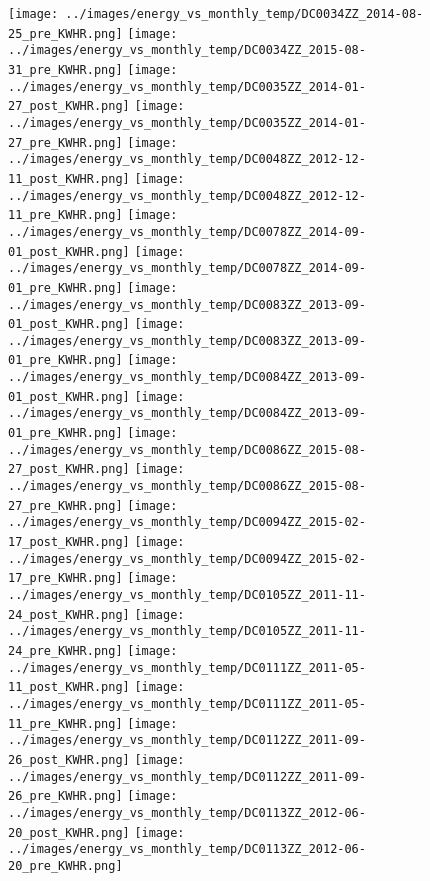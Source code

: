 \clearpage
\begin{figure}
\centering
\texttt{[image: ../images/energy\_vs\_monthly\_temp/DC0034ZZ\_2014-08-25\_pre\_KWHR.png]}
\texttt{[image: ../images/energy\_vs\_monthly\_temp/DC0034ZZ\_2015-08-31\_pre\_KWHR.png]}
\texttt{[image: ../images/energy\_vs\_monthly\_temp/DC0035ZZ\_2014-01-27\_post\_KWHR.png]}
\texttt{[image: ../images/energy\_vs\_monthly\_temp/DC0035ZZ\_2014-01-27\_pre\_KWHR.png]}
\texttt{[image: ../images/energy\_vs\_monthly\_temp/DC0048ZZ\_2012-12-11\_post\_KWHR.png]}
\texttt{[image: ../images/energy\_vs\_monthly\_temp/DC0048ZZ\_2012-12-11\_pre\_KWHR.png]}
\texttt{[image: ../images/energy\_vs\_monthly\_temp/DC0078ZZ\_2014-09-01\_post\_KWHR.png]}
\texttt{[image: ../images/energy\_vs\_monthly\_temp/DC0078ZZ\_2014-09-01\_pre\_KWHR.png]}
\texttt{[image: ../images/energy\_vs\_monthly\_temp/DC0083ZZ\_2013-09-01\_post\_KWHR.png]}
\texttt{[image: ../images/energy\_vs\_monthly\_temp/DC0083ZZ\_2013-09-01\_pre\_KWHR.png]}
\texttt{[image: ../images/energy\_vs\_monthly\_temp/DC0084ZZ\_2013-09-01\_post\_KWHR.png]}
\texttt{[image: ../images/energy\_vs\_monthly\_temp/DC0084ZZ\_2013-09-01\_pre\_KWHR.png]}
\texttt{[image: ../images/energy\_vs\_monthly\_temp/DC0086ZZ\_2015-08-27\_post\_KWHR.png]}
\texttt{[image: ../images/energy\_vs\_monthly\_temp/DC0086ZZ\_2015-08-27\_pre\_KWHR.png]}
\texttt{[image: ../images/energy\_vs\_monthly\_temp/DC0094ZZ\_2015-02-17\_post\_KWHR.png]}
\texttt{[image: ../images/energy\_vs\_monthly\_temp/DC0094ZZ\_2015-02-17\_pre\_KWHR.png]}
\texttt{[image: ../images/energy\_vs\_monthly\_temp/DC0105ZZ\_2011-11-24\_post\_KWHR.png]}
\texttt{[image: ../images/energy\_vs\_monthly\_temp/DC0105ZZ\_2011-11-24\_pre\_KWHR.png]}
\texttt{[image: ../images/energy\_vs\_monthly\_temp/DC0111ZZ\_2011-05-11\_post\_KWHR.png]}
\texttt{[image: ../images/energy\_vs\_monthly\_temp/DC0111ZZ\_2011-05-11\_pre\_KWHR.png]}
\texttt{[image: ../images/energy\_vs\_monthly\_temp/DC0112ZZ\_2011-09-26\_post\_KWHR.png]}
\texttt{[image: ../images/energy\_vs\_monthly\_temp/DC0112ZZ\_2011-09-26\_pre\_KWHR.png]}
\texttt{[image: ../images/energy\_vs\_monthly\_temp/DC0113ZZ\_2012-06-20\_post\_KWHR.png]}
\texttt{[image: ../images/energy\_vs\_monthly\_temp/DC0113ZZ\_2012-06-20\_pre\_KWHR.png]}
\end{figure}
